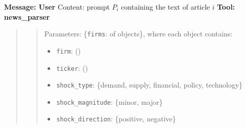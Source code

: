 \begin{algorithm}[H]
\begin{algorithmic}[1]
    \State \textbf{Message: User} \Comment{\scalebox{0.9}{\textcolor{lightgray}{User provides the article text as input}}}
    \Statex \hspace{1cm} Content: prompt $P_i$ containing the text of article $i$
    \State \textbf{Tool: news\_parser} 
%    
\begin{quote}
\begin{quote}
Parameters: \{\texttt{firms}:  of objects\}, where each object contains:
            \begin{itemize}
                \item \texttt{firm}: \hspace{2.1cm}  ()
                \item \texttt{ticker}: \hspace{1.7cm}  ()
                \item \texttt{shock\_type}: \hspace{0.9cm}  \{demand, supply, financial, policy, technology\}
                \item \texttt{shock\_magnitude}:  \hspace{0cm} \{minor, major\}
                \item \texttt{shock\_direction}: \hspace{0cm} \{positive, negative\}
            \end{itemize} 
\end{quote} 
\end{quote} 
 

\end{algorithmic}
\end{algorithm}
